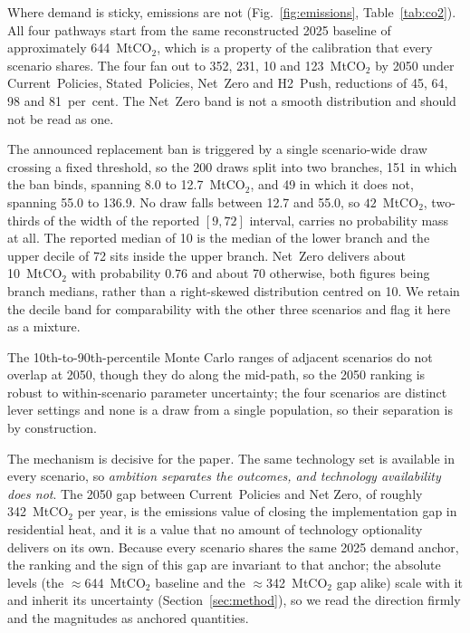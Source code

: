 Where demand is sticky, emissions are not (Fig.~\ref{fig:emissions}, Table~\ref{tab:co2}).
All four pathways start from the same reconstructed 2025 baseline of approximately
644~MtCO$_2$, which is a property of the calibration that every scenario shares. The four
fan out to 352, 231, 10 and 123~MtCO$_2$ by 2050 under Current~Policies, Stated~Policies, Net~Zero and
H2~Push, reductions of 45, 64, 98 and 81~per~cent. The Net~Zero band is not a
smooth distribution and should not be read as one.

The announced replacement ban is
triggered by a single scenario-wide draw crossing a fixed threshold, so the 200 draws
split into two branches, 151 in which the ban binds, spanning 8.0 to 12.7~MtCO$_2$, and 49
in which it does not, spanning 55.0 to 136.9. No draw falls between 12.7 and 55.0, so
$42$~MtCO$_2$, two-thirds of the width of the reported $[9, 72]$ interval, carries no
probability mass at all. The reported median of 10 is the median of the lower branch and
the upper decile of 72 sits inside the upper branch. Net~Zero delivers about 10~MtCO$_2$ with probability $0.76$ and about 70 otherwise, both
figures being branch medians, rather
than a right-skewed distribution centred on 10. We retain the decile band for
comparability with the other three scenarios and flag it here as a mixture.

The 10th-to-90th-percentile Monte Carlo ranges of adjacent scenarios do not overlap at 2050, though they do along the
mid-path, so the 2050 ranking is robust
to within-scenario parameter uncertainty; the four scenarios are distinct lever settings and none is a draw from a single population, so their separation is by construction.

The mechanism is decisive for the paper. The same
technology set is available in every scenario, so \emph{ambition separates the outcomes, and technology availability does not}. The 2050 gap between Current~Policies and Net
Zero, of roughly 342~MtCO$_2$ per year, is the emissions value of closing the
implementation gap in residential heat, and it is a value that no amount of
technology optionality delivers on its own. Because every scenario shares the same
2025 demand anchor, the ranking and the sign of this gap are invariant to that
anchor; the absolute levels (the $\approx$644~MtCO$_2$ baseline and the
$\approx$342~MtCO$_2$ gap alike) scale with it and inherit its uncertainty
(Section~\ref{sec:method}), so we read the direction firmly and the magnitudes as
anchored quantities.

